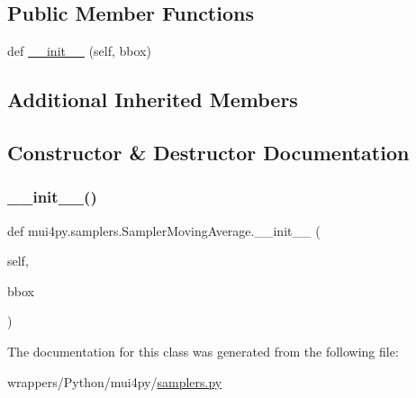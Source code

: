 \subsection*{Public Member Functions}
\begin{DoxyCompactItemize}
\item 
def \hyperlink{classmui4py_1_1samplers_1_1_sampler_moving_average_a237ab9938dd2d2182706ad1b812910ae}{\+\_\+\+\_\+init\+\_\+\+\_\+} (self, bbox)
\end{DoxyCompactItemize}
\subsection*{Additional Inherited Members}


\subsection{Constructor \& Destructor Documentation}
\mbox{\label{classmui4py_1_1samplers_1_1_sampler_moving_average_a237ab9938dd2d2182706ad1b812910ae}} 
\subsubsection{\texorpdfstring{\+\_\+\+\_\+init\+\_\+\+\_\+()}{\_\_init\_\_()}}
{\footnotesize\ttfamily def mui4py.\+samplers.\+Sampler\+Moving\+Average.\+\_\+\+\_\+init\+\_\+\+\_\+ (\begin{DoxyParamCaption}\item[{}]{self,  }\item[{}]{bbox }\end{DoxyParamCaption})}



The documentation for this class was generated from the following file\+:\begin{DoxyCompactItemize}
\item 
wrappers/\+Python/mui4py/\hyperlink{samplers_8py}{samplers.\+py}\end{DoxyCompactItemize}

